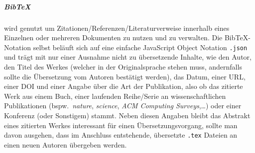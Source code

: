 \subparagraph*{Bib\TeX{}} wird genutzt um Zitationen/Referenzen/Literaturverweise innerhalb eines Einzelnen oder mehreren Dokumenten zu nutzen und zu verwalten. Die Bib\TeX{}-Notation selbst beläuft sich auf eine einfache JavaScript Object Notation \texttt{.json} und trägt mit nur einer Ausnahme nicht zu übersetzende Inhalte, wie den Autor, den Titel des Werkes (welcher in der Originalsprache stehen muss, andernfalls sollte die Übersetzung vom Autoren bestätigt werden), das Datum, einer URL, einer DOI und einer Angabe über die Art der Publikation, also ob das zitierte Werk aus einem Buch, einer laufenden Reihe/Serie an wissenschaftlichen Publikationen (bspw.\ \textit{nature}, \textit{science}, \textit{ACM Computing Surveys},\ldots) oder einer Konferenz (oder Sonstigem) stammt. Neben diesen Angaben bleibt das Abstrakt eines zitierten Werkes interessant für einen Übersetzungsvorgang, sollte man davon ausgehen, dass im Anschluss entstehende, übersetzte \texttt{.tex} Dateien an einen neuen Autoren übergeben werden. %

